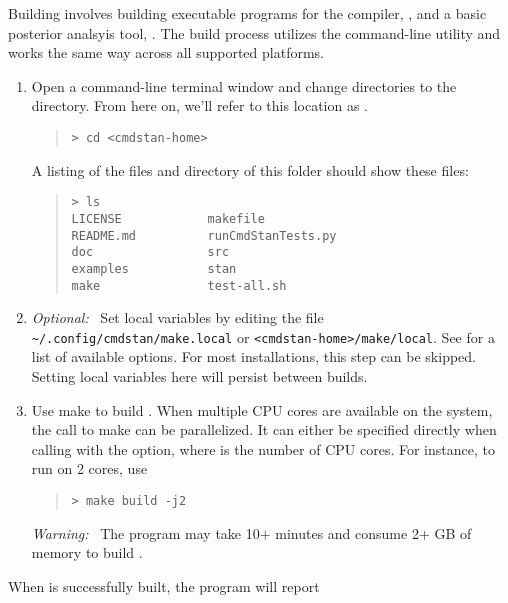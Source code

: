 Building \CmdStan involves building executable programs for the \Stan
compiler, , and a basic posterior analsyis tool,
.  The build process utilizes the  command-line
utility and works the same way across all supported platforms.
%
\begin{enumerate}
  \item Open a command-line terminal window and change directories to
    the \CmdStan directory. From here on, we'll refer to this location as
    .
    \begin{quote}
      \begin{Verbatim}[fontshape=sl]
> cd <cmdstan-home>
      \end{Verbatim}
    \end{quote}
    \noindent
    A listing of the files and directory of this folder should show these files:
    \begin{quote}
      \begin{Verbatim}
> ls
LICENSE            makefile
README.md          runCmdStanTests.py
doc                src
examples           stan
make               test-all.sh
      \end{Verbatim}
    \end{quote}
  \item \emph{Optional:} \ Set local  variables by editing
    the file \verb+~/.config/cmdstan/make.local+ or
    \verb+<cmdstan-home>/make/local+. See 
    for a list of available options.  For most installations, this
    step can be skipped. Setting local  variables here will
    persist between builds.
  \item Use make to build \CmdStan. When multiple CPU cores are
    available on the system, the call to make can be parallelized.  It
    can either be specified directly when calling  with the
     option, where  is the
    number of CPU cores. For instance, to run on 2 cores, use
    \begin{quote}
      \begin{Verbatim}[fontshape=sl]
> make build -j2
      \end{Verbatim}
    \end{quote}
    \emph{Warning:} \ The  program may take 10+ minutes and
    consume 2+ GB of memory to build \CmdStan.
\end{enumerate}
%
When \CmdStan is successfully built, the  program will report
